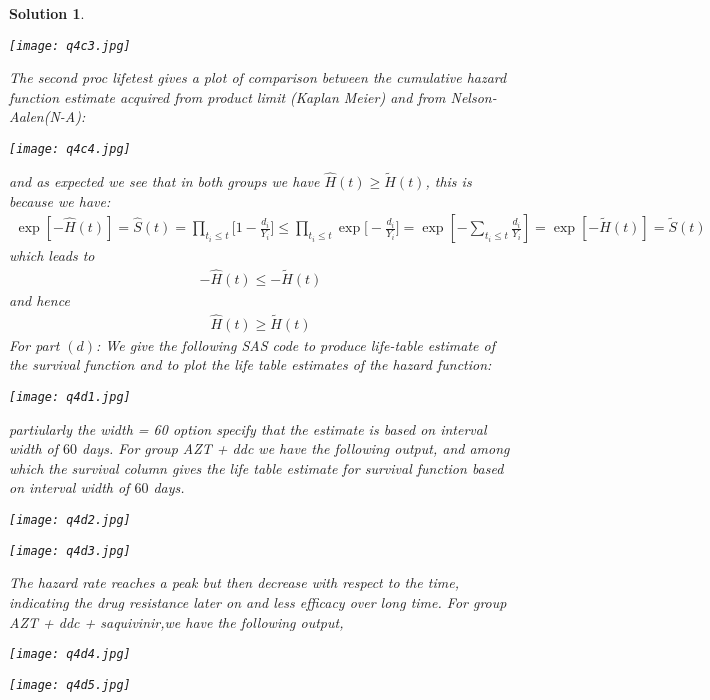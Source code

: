 \documentclass[11pt]{article}
\newtheorem{sol}{Solution}
\begin{document}
\begin{sol}
\begin{center}
		\texttt{[image: q4c3.jpg]}
	\end{center}
	The second proc lifetest gives a plot of comparison between the cumulative hazard function estimate acquired from product limit (Kaplan Meier) and from Nelson-Aalen(N-A):
	\begin{center}
		\texttt{[image: q4c4.jpg]}
	\end{center}
	and as expected we see that in both groups we have $\hat{H}(t) \geq \tilde{H}(t)$, this is because we have:
	\begin{align*}
		\exp[-\hat{H}(t)] = \hat{S}(t) = \prod_{t_i \leq t}\Big[1 - \frac{d_i}{Y_i}\Big] \leq \prod_{t_i \leq t}\exp\Big[-\frac{d_i}{Y_i}\Big] = \exp[-\sum_{t_i \leq t}\frac{d_i}{Y_i}] = \exp[-\tilde{H}(t)] = \tilde{S}(t)
	\end{align*}
	which leads to
	\begin{align*}
		-\hat{H}(t) \leq -\tilde{H}(t)
	\end{align*}
	and hence
	\begin{align*}
		\hat{H}(t) \geq  \tilde{H}(t)
	\end{align*}
	For part $(d)$:\vskip 2mm
	We give the following SAS code to produce life-table estimate of the survival function and to plot the life table estimates of the hazard function:
	\begin{center}
		\texttt{[image: q4d1.jpg]}
	\end{center}
	partiularly the width = 60  option specify that the estimate is based on interval width of $60$ days.\vskip 2mm
	For group AZT + ddc we have the following output,  and among which the survival column gives the life table estimate for survival function based on interval width of $60$ days.
	\begin{center}
		\texttt{[image: q4d2.jpg]}
	\end{center}
	\begin{center}
		\texttt{[image: q4d3.jpg]}
	\end{center}
	The hazard rate reaches a peak but then decrease with respect to the time, indicating the drug resistance later on and less efficacy over long time.\vskip 2mm
	For group AZT + ddc + saquivinir,we have the following output,
	\begin{center}
		\texttt{[image: q4d4.jpg]}
	\end{center}
	\begin{center}
		\texttt{[image: q4d5.jpg]}
	\end{center}

\end{sol}
\end{document}
